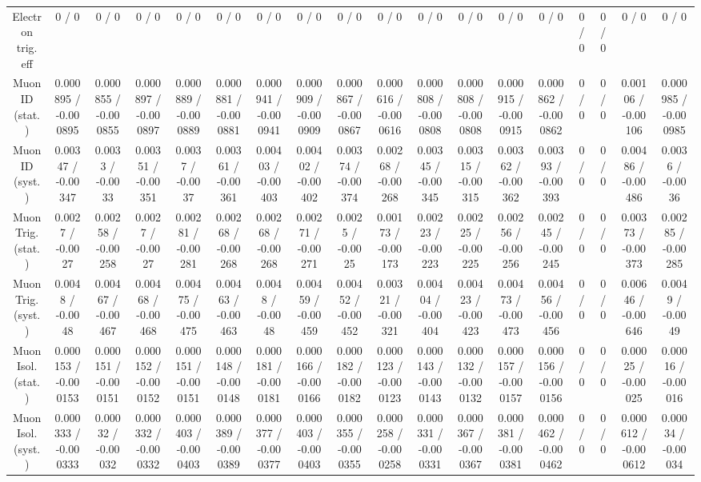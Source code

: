 \documentclass[10pt]{article}
\begin{document}
\begin{table}[htbp]
\begin{center}
\begin{tabular}{|c|c|c|c|c|c|c|c|c|c|c|c|c|c|c|c|c|c|}
  Electron trig. eff & 0 / 0 & 0 / 0 & 0 / 0 & 0 / 0 & 0 / 0 & 0 / 0 & 0 / 0 & 0 / 0 & 0 / 0 & 0 / 0 & 0 / 0 & 0 / 0 & 0 / 0 & 0 / 0 & 0 / 0 & 0 / 0 & 0 / 0 \\ 
  Muon ID (stat.) & 0.000895 / -0.000895 & 0.000855 / -0.000855 & 0.000897 / -0.000897 & 0.000889 / -0.000889 & 0.000881 / -0.000881 & 0.000941 / -0.000941 & 0.000909 / -0.000909 & 0.000867 / -0.000867 & 0.000616 / -0.000616 & 0.000808 / -0.000808 & 0.000808 / -0.000808 & 0.000915 / -0.000915 & 0.000862 / -0.000862 & 0 / 0 & 0 / 0 & 0.00106 / -0.00106 & 0.000985 / -0.000985 \\ 
  Muon ID (syst.) & 0.00347 / -0.00347 & 0.0033 / -0.0033 & 0.00351 / -0.00351 & 0.0037 / -0.0037 & 0.00361 / -0.00361 & 0.00403 / -0.00403 & 0.00402 / -0.00402 & 0.00374 / -0.00374 & 0.00268 / -0.00268 & 0.00345 / -0.00345 & 0.00315 / -0.00315 & 0.00362 / -0.00362 & 0.00393 / -0.00393 & 0 / 0 & 0 / 0 & 0.00486 / -0.00486 & 0.0036 / -0.0036 \\ 
  Muon Trig. (stat.) & 0.0027 / -0.0027 & 0.00258 / -0.00258 & 0.0027 / -0.0027 & 0.00281 / -0.00281 & 0.00268 / -0.00268 & 0.00268 / -0.00268 & 0.00271 / -0.00271 & 0.0025 / -0.0025 & 0.00173 / -0.00173 & 0.00223 / -0.00223 & 0.00225 / -0.00225 & 0.00256 / -0.00256 & 0.00245 / -0.00245 & 0 / 0 & 0 / 0 & 0.00373 / -0.00373 & 0.00285 / -0.00285 \\ 
  Muon Trig. (syst.) & 0.0048 / -0.0048 & 0.00467 / -0.00467 & 0.00468 / -0.00468 & 0.00475 / -0.00475 & 0.00463 / -0.00463 & 0.0048 / -0.0048 & 0.00459 / -0.00459 & 0.00452 / -0.00452 & 0.00321 / -0.00321 & 0.00404 / -0.00404 & 0.00423 / -0.00423 & 0.00473 / -0.00473 & 0.00456 / -0.00456 & 0 / 0 & 0 / 0 & 0.00646 / -0.00646 & 0.0049 / -0.0049 \\ 
  Muon Isol. (stat.) & 0.000153 / -0.000153 & 0.000151 / -0.000151 & 0.000152 / -0.000152 & 0.000151 / -0.000151 & 0.000148 / -0.000148 & 0.000181 / -0.000181 & 0.000166 / -0.000166 & 0.000182 / -0.000182 & 0.000123 / -0.000123 & 0.000143 / -0.000143 & 0.000132 / -0.000132 & 0.000157 / -0.000157 & 0.000156 / -0.000156 & 0 / 0 & 0 / 0 & 0.00025 / -0.00025 & 0.00016 / -0.00016 \\ 
  Muon Isol. (syst.) & 0.000333 / -0.000333 & 0.00032 / -0.00032 & 0.000332 / -0.000332 & 0.000403 / -0.000403 & 0.000389 / -0.000389 & 0.000377 / -0.000377 & 0.000403 / -0.000403 & 0.000355 / -0.000355 & 0.000258 / -0.000258 & 0.000331 / -0.000331 & 0.000367 / -0.000367 & 0.000381 / -0.000381 & 0.000462 / -0.000462 & 0 / 0 & 0 / 0 & 0.000612 / -0.000612 & 0.00034 / -0.00034 \\ 

\end{tabular}
\end{center}
\end{table}
\end{document}
